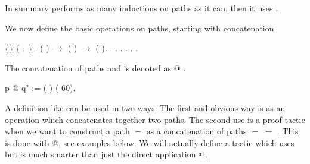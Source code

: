 \documentclass[12pt]{report}
\begin{document}
   In summary  performs as many inductions on paths as
   it can, then it uses .  \begin{coqdoccode}
\coqdocemptyline
\end{coqdoccode}
We now define the basic operations on paths, starting with
   concatenation. \begin{coqdoccode}
\coqdocemptyline
\coqdocnoindent
{}  \{\} \{   : \} : (  ) \ensuremath{\rightarrow} (  ) \ensuremath{\rightarrow} (  ).\coqdoceol
\coqdocnoindent
{}.\coqdoceol
\coqdocindent{1.00em}
      .\coqdoceol
\coqdocindent{1.00em}
 .\coqdoceol
\coqdocindent{1.00em}
 .\coqdoceol
\coqdocindent{1.00em}
 .\coqdoceol
\coqdocnoindent
{}.\coqdoceol
\coqdocemptyline
\end{coqdoccode}
The concatenation of paths  and  is denoted as  @ . \begin{coqdoccode}
\coqdocemptyline
\coqdocnoindent
{}p @ q" := (  ) (  60).\coqdoceol
\coqdocemptyline
\end{coqdoccode}
A definition like  can be used in two ways. The first and
   obvious way is as an operation which concatenates together two
   paths. The second use is a proof tactic when we want to construct a
   path  $=$  as a concatenation of paths  $=$  $=$ . This is
   done with  @, see examples below. We will actually
   define a tactic  which uses  but is much smarter
   than just the direct application  @. \begin{coqdoccode}
\coqdocemptyline
\end{coqdoccode}
\end{document}
